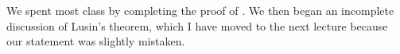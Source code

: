 \documentclass[../notes.tex]{subfiles}
\begin{document}
We spent most class by completing the proof of . We then began an incomplete discussion of Lusin's theorem, which I have moved to the next lecture because our statement was slightly mistaken.
\end{document}
